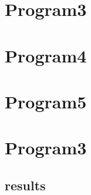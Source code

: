 \documentclass[12pt]{article}%
\theoremstyle{definition}
\begin{document}
	\newpage
	
	\section{Program3}
	
	\begin{figure}[h]
	\end{figure}
	
	\newpage
	
	\section{Program4}
	
	\begin{figure}[h]
	\end{figure}
	
	\newpage
		
	\section{Program5}
		
	\begin{figure}[h]
	\end{figure}
	
	

	
	
	
	\section{Program3}
	
	
	
	

		

	
	
	
	
	
	
	\subsection{results}
	

	
	
	
	
	
	
		
	\newpage
	
	
	
	
%	
%	
	
	
\end{document}

